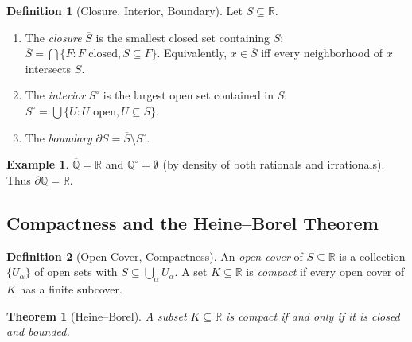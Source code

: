 \documentclass[11pt,a4paper]{article}
\theoremstyle{definition}
\newtheorem{definition}{Definition}[section]
\newtheorem{example}{Example}[section]
\theoremstyle{plain}
\newtheorem{theorem}{Theorem}[section]
\theoremstyle{remark}
\newcommand{\R}{\mathbb{R}}
\newcommand{\Q}{\mathbb{Q}}
\begin{document}
\begin{definition}[Closure, Interior, Boundary]
\label{def:closure_interior}
Let $S \subseteq \R$.
\begin{enumerate}[nosep,label=(\roman*)]
    \item The \emph{closure} $\overline{S}$ is the smallest closed set containing
    $S$: $\overline{S} = \bigcap\{F : F \text{ closed}, S \subseteq F\}$.
    Equivalently, $x \in \overline{S}$ iff every neighborhood of $x$ intersects $S$.
    \item The \emph{interior} $S^\circ$ is the largest open set contained in $S$:
    $S^\circ = \bigcup\{U : U \text{ open}, U \subseteq S\}$.
    \item The \emph{boundary} $\partial S = \overline{S} \setminus S^\circ$.
\end{enumerate}
\end{definition}

\begin{example}
\label{ex:closure}
$\overline{\Q} = \R$ and $\Q^\circ = \emptyset$ (by density of both rationals and
irrationals). Thus $\partial \Q = \R$.
\end{example}

\subsection{Compactness and the Heine--Borel Theorem}
\label{subsec:compactness}

\begin{definition}[Open Cover, Compactness]
\label{def:compact}
An \emph{open cover} of $S \subseteq \R$ is a collection $\{U_\alpha\}$ of open
sets with $S \subseteq \bigcup_\alpha U_\alpha$. A set $K \subseteq \R$ is
\emph{compact} if every open cover of $K$ has a finite subcover.
\end{definition}

\begin{theorem}[Heine--Borel]
\label{thm:heine_borel}
A subset $K \subseteq \R$ is compact if and only if it is closed and bounded.
\end{theorem}
\end{document}

